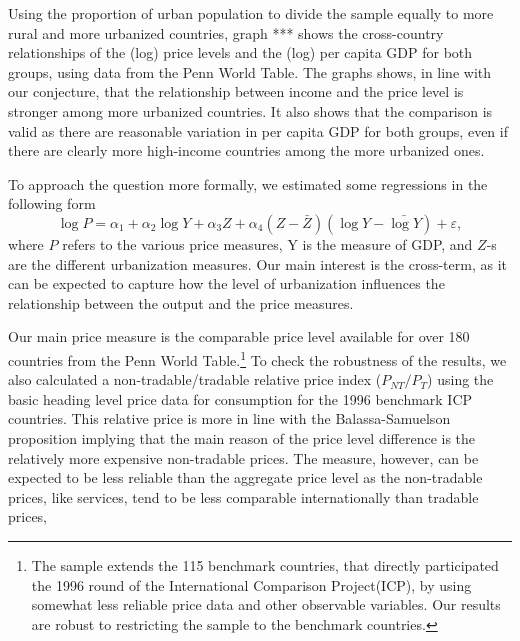 \documentclass[12pt]{article}
\begin{document}
Using the proportion of urban population to divide the sample
equally to more rural and more urbanized countries, graph
*** shows the cross-country relationships of the (log) price levels
and the (log) per capita GDP for both groups, using data from the
Penn World Table. The graphs shows, in line with our conjecture,
that the relationship between income and the price level is stronger
among more urbanized countries. It also shows that the comparison is
valid as there are reasonable variation in per capita GDP for both
groups, even if there are clearly more high-income countries among
the more urbanized ones.

To approach the question more formally, we estimated some
regressions in the following form
\begin{equation}
\log{P}=\alpha_1+\alpha_2\log Y+\alpha_3Z+\alpha_4(Z-\bar{Z})(\log Y-\bar{\log Y})+\varepsilon,
\end{equation}
where $P$ refers to the various price measures, Y is the measure of
GDP, and $Z$-s are the different urbanization measures. Our main
interest is the cross-term, as it can be expected to capture how the
level of urbanization influences the relationship between the output
and the price measures.

Our main price measure is the comparable price level available for
over 180 countries from the Penn World Table.\footnote{The sample
extends the 115 benchmark countries, that directly participated the
1996 round of the International Comparison Project(ICP), by using
somewhat less reliable price data and other observable variables.
Our results are robust to restricting the sample to the benchmark
countries.} To check the robustness of the results, we also
calculated a non-tradable/tradable relative price index
($P_{NT}/P_{T}$) using the basic heading level price data for
consumption for the 1996 benchmark ICP countries. This relative
price is more in line with the Balassa-Samuelson proposition
implying that the main reason of the price level difference is the
relatively more expensive non-tradable prices. The measure, however,
can be expected to be less reliable than the aggregate price level
as the non-tradable prices, like services, tend to be less
comparable internationally than tradable prices,
\end{document}
